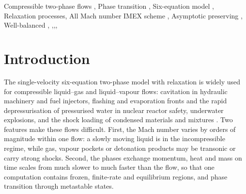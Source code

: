 \documentclass[a4paper,fleqn]{cas-sc}
\begin{document}
\begin{keywords}
Compressible two-phase flows \sep
Phase transition \sep
Six-equation model \sep
Relaxation processes\sep
All Mach number IMEX scheme \sep
Asymptotic preserving \sep
Well-balanced \sep
 \sep \sep \sep
\end{keywords}

\maketitle

\section{Introduction}
\label{sec:intro}

The single-velocity six-equation two-phase model with relaxation \cite{SPB2009,PelantiShyue2014,Pelanti2022} is widely
used for compressible liquid--gas and liquid--vapour flows: cavitation in hydraulic machinery and fuel injectors,
flashing and evaporation fronts and the rapid depressurisation of pressurised water in nuclear reactor safety,
underwater explosions, and the shock loading of condensed materials and mixtures
\cite{SaurelPetitpasAbgrall2008,Bartak1990,PelantiShyue2019,Chiapolino2017,DeLorenzo2018,DeLorenzo2019,Schmidmayer2020,SaurelPantano2018}.
Two features make these flows difficult. First, the Mach number varies by orders of magnitude within one flow: a slowly moving liquid is in the incompressible regime, while gas, vapour pockets or detonation products may be
transonic or carry strong shocks. Second, the phases exchange momentum, heat and mass on time scales from much slower to
much faster than the flow, so that one computation contains frozen, finite-rate and equilibrium regions, and phase
transition through metastable states.
\end{document}
